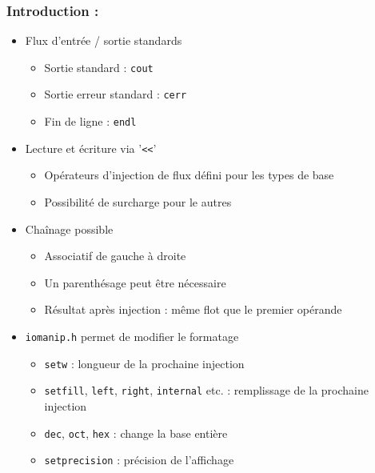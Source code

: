 \begin{frame}
\frametitle{Introduction : \cpp}
\begin{itemize}[<+->]
\item Flux d'entrée / sortie standards
	\begin{itemize}
	\item Sortie standard : \texttt{cout} 
	\item Sortie erreur standard : \texttt{cerr}
	\item Fin de ligne : \texttt{endl}
	\end{itemize}
\item Lecture et écriture via '\texttt{<<}'
	\begin{itemize}
	\item Opérateurs d'injection de flux défini pour les types de base
	\item Possibilité de surcharge pour le autres
	\end{itemize}
\item Chaînage possible
	\begin{itemize}
	\item Associatif de gauche à droite
	\item Un parenthésage peut être nécessaire
	\item Résultat après injection : même flot que le premier opérande
	\end{itemize}
\item \texttt{iomanip.h} permet de modifier le formatage
	\begin{itemize}
	\item \texttt{setw} : longueur de la prochaine injection
	\item \texttt{setfill}, \texttt{left}, \texttt{right}, \texttt{internal} etc. : remplissage de la prochaine injection
	\item \texttt{dec}, \texttt{oct}, \texttt{hex} : change la base entière
	\item \texttt{setprecision} : précision de l'affichage
	\end{itemize}
\end{itemize}
\end{frame}

